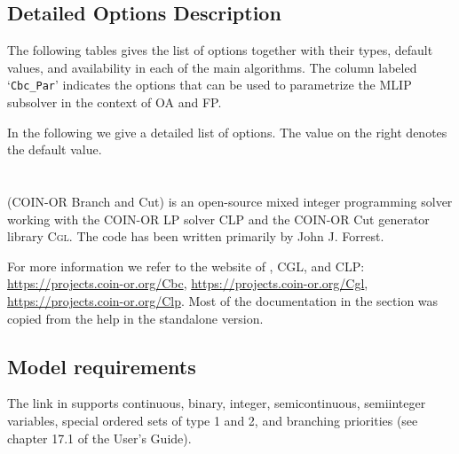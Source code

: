 \subsection{Detailed Options Description}
\label{sub:bonminalloptions}

The following tables gives the list of options together with their types, default values, and availability in each of the main algorithms.
The column labeled `\texttt{Cbc\_Par}' indicates the options that can be used to parametrize the MLIP subsolver in the context of OA and FP.



In the following we give a detailed list of \BONMIN options.
The value on the right denotes the default value.


\section{\CBC}
\label{sec:coincbc}
\hypertarget{sec:coincbc}{}


\CBC (COIN-OR Branch and Cut) is an open-source mixed integer programming solver working with the COIN-OR LP solver \textsc{CLP} and the COIN-OR Cut generator library \textsc{Cgl}.
The code has been written primarily by John J. Forrest.

For more information we refer to the website of \CBC, \textsc{CGL}, and \textsc{CLP}:
\url{https://projects.coin-or.org/Cbc}, \url{https://projects.coin-or.org/Cgl}, \url{https://projects.coin-or.org/Clp}.
Most of the \CBC documentation in the section was copied from the help in the \CBC standalone version.

\subsection{Model requirements}

The \CBC link in \GAMS supports continuous, binary, integer, semicontinuous, semiinteger variables, special ordered sets of type 1 and 2, and branching priorities (see chapter 17.1 of the \GAMS User's Guide).

